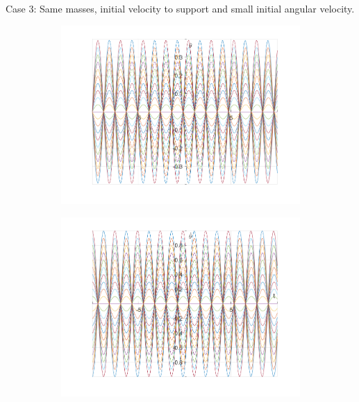 \documentclass{article}
\begin{document}
	
	Case 3:
	Same masses, initial velocity to support and small initial angular velocity.
			\graphicspath{{./SmallOscillations/S3} }
	\begin{figure}[h!]
		\centering
		\begin{subfigure}[b]{0.48\linewidth}
			\includegraphics[width=\linewidth]{./SmallOscillations/S3/F1.png}
		\end{subfigure}
		\begin{subfigure}[b]{0.48\linewidth}
			\includegraphics[width=\linewidth]{./SmallOscillations/S3/F2.png}
		\end{subfigure}
	\end{figure}
\end{document}
